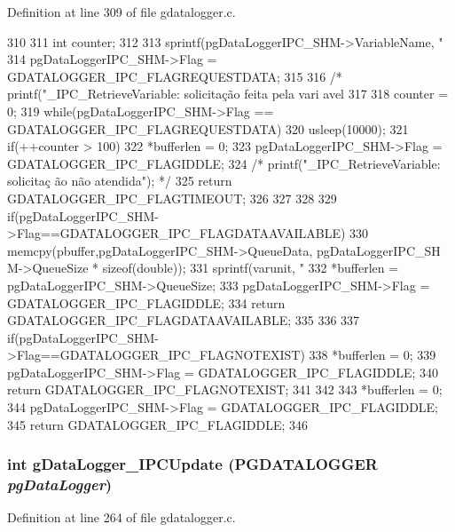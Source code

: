 Definition at line 309 of file gdatalogger.c.


\begin{DoxyCode}
310 {
311         int counter;
312         
313         sprintf(pgDataLoggerIPC_SHM->VariableName, "%
314         pgDataLoggerIPC_SHM->Flag = GDATALOGGER_IPC_FLAGREQUESTDATA;
315         
316 /*      printf("\ngDataLogger_IPC_RetrieveVariable: solicitação feita pela vari
      avel %
317 
318         counter = 0;
319         while(pgDataLoggerIPC_SHM->Flag == GDATALOGGER_IPC_FLAGREQUESTDATA){
320                 usleep(10000);
321                 if(++counter > 100){
322                         *bufferlen = 0;
323                         pgDataLoggerIPC_SHM->Flag = GDATALOGGER_IPC_FLAGIDDLE;
324                         /* printf("\ngDataLogger_IPC_RetrieveVariable: solicitaç
      ão não atendida"); */
325                         return GDATALOGGER_IPC_FLAGTIMEOUT;
326                 }
327         }
328         
329         if(pgDataLoggerIPC_SHM->Flag==GDATALOGGER_IPC_FLAGDATAAVAILABLE){
330                 memcpy(pbuffer,pgDataLoggerIPC_SHM->QueueData, pgDataLoggerIPC_SH
      M->QueueSize * sizeof(double));
331                 sprintf(varunit, "%
332                 *bufferlen = pgDataLoggerIPC_SHM->QueueSize;
333                 pgDataLoggerIPC_SHM->Flag = GDATALOGGER_IPC_FLAGIDDLE;
334                 return GDATALOGGER_IPC_FLAGDATAAVAILABLE;
335         }
336 
337         if(pgDataLoggerIPC_SHM->Flag==GDATALOGGER_IPC_FLAGNOTEXIST){
338                 *bufferlen = 0;
339                 pgDataLoggerIPC_SHM->Flag = GDATALOGGER_IPC_FLAGIDDLE;
340                 return GDATALOGGER_IPC_FLAGNOTEXIST;
341         }
342         
343         *bufferlen = 0;
344         pgDataLoggerIPC_SHM->Flag = GDATALOGGER_IPC_FLAGIDDLE;
345         return GDATALOGGER_IPC_FLAGIDDLE;
346 }
\end{DoxyCode}
\subsubsection[{gDataLogger\_\-IPCUpdate}]{\setlength{\rightskip}{0pt plus 5cm}int gDataLogger\_\-IPCUpdate ({\bf PGDATALOGGER} {\em pgDataLogger})}\label{gdatalogger_8h_afa42a993493cf98d32da11e4279816f7}


Definition at line 264 of file gdatalogger.c.


